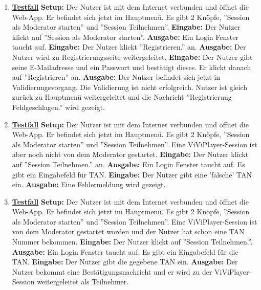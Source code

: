 \begin{enumerate}
	\item \underline{\textbf{Testfall}} \linebreak
	\textbf{Setup:} Der Nutzer ist mit dem Internet verbunden und öffnet die Web-App. Er befindet sich jetzt im Hauptmenü. Es gibt 2 Knöpfe, ''Session als Moderator starten'' und ''Session Teilnehmen''. \linebreak
	\textbf{Eingabe:} Der Nutzer klickt auf ''Session als Moderator starten''. \linebreak
	\textbf{Ausgabe:} Ein Login Fenster taucht auf.\linebreak
	\textbf{Eingabe:} Der Nutzer klickt ''Registrieren.'' an.\linebreak
	\textbf{Ausgabe:} Der Nutzer wird zu Registrierungsseite weitergeleitet.\linebreak
	\textbf{Eingabe:} Der Nutzer gibt seine E-Mailadresse und ein Passwort und bestätigt dieses. Er klickt danach auf ''Registrieren'' an. \linebreak
	\textbf{Ausgabe:} Der Nutzer befindet sich jetzt in Validierungsvorgang. Die Validierung ist nicht erfolgreich. Nutzer ist gleich zurück zu Hauptmenü weitergeleitet und die Nachricht ''Registrierung Fehlgeschlagen.'' wird gezeigt.\linebreak
	
	\item \underline{\textbf{Testfall}} \linebreak
	\textbf{Setup:} Der Nutzer ist mit dem Internet verbunden und öffnet die Web-App. Er befindet sich jetzt im Hauptmenü. Es gibt 2 Knöpfe, ''Session als Moderator starten'' und ''Session Teilnehmen''.
	Eine ViViPlayer-Session ist aber noch nicht von dem Moderator gestartet. \linebreak
	\textbf{Eingabe:} Der Nutzer klickt auf ''Session Teilnehmen.'' an. \linebreak
	\textbf{Ausgabe:} Ein Login Fenster taucht auf. Es gibt ein Eingabefeld für TAN.\linebreak
	\textbf{Eingabe:} Der Nutzer gibt eine 'falsche' TAN ein. \linebreak
	\textbf{Ausgabe:} Eine Fehlermeldung wird gezeigt.
	
	\item \underline{\textbf{Testfall}} \linebreak
	\textbf{Setup:} Der Nutzer ist mit dem Internet verbunden und öffnet die Web-App. Er befindet sich jetzt im Hauptmenü. Es gibt 2 Knöpfe, ''Session als Moderator starten'' und ''Session Teilnehmen''. Eine ViViPlayer-Session ist von dem Moderator gestartet worden und der Nutzer hat schon eine TAN Nummer bekommen. \linebreak
	\textbf{Eingabe:} Der Nutzer klickt auf ''Session Teilnehmen.''. \linebreak
	\textbf{Ausgabe:} Ein Login Fenster taucht auf. Es gibt ein Eingabefeld für die TAN.\linebreak
	\textbf{Eingabe:} Der Nutzer gibt die gegebene TAN ein. \linebreak
	\textbf{Ausgabe:} Der Nutzer bekommt eine Bestätigungsnachricht und er wird zu der ViViPlayer-Session weitergeleitet als Teilnehmer.
	

\end{enumerate}
